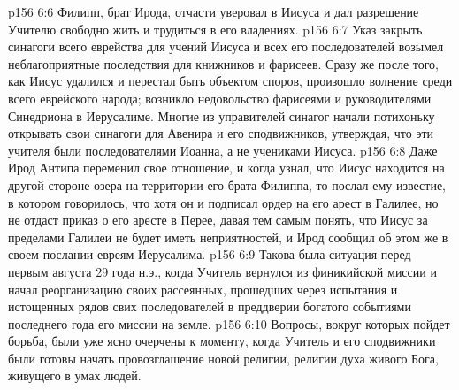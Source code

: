 \vs p156 6:6 Филипп, брат Ирода, отчасти уверовал в Иисуса и дал разрешение Учителю свободно жить и трудиться в его владениях.
\vs p156 6:7 Указ закрыть синагоги всего еврейства для учений Иисуса и всех его последователей возымел неблагоприятные последствия для книжников и фарисеев. Сразу же после того, как Иисус удалился и перестал быть объектом споров, произошло волнение среди всего еврейского народа; возникло недовольство фарисеями и руководителями Синедриона в Иерусалиме. Многие из управителей синагог начали потихоньку открывать свои синагоги для Авенира и его сподвижников, утверждая, что эти учителя были последователями Иоанна, а не учениками Иисуса.
\vs p156 6:8 Даже Ирод Антипа переменил свое отношение, и когда узнал, что Иисус находится на другой стороне озера на территории его брата Филиппа, то послал ему известие, в котором говорилось, что хотя он и подписал ордер на его арест в Галилее, но не отдаст приказ о его аресте в Перее, давая тем самым понять, что Иисус за пределами Галилеи не будет иметь неприятностей, и Ирод сообщил об этом же в своем послании евреям Иерусалима.
\vs p156 6:9 Такова была ситуация перед первым августа 29 года н.э., когда Учитель вернулся из финикийской миссии и начал реорганизацию своих рассеянных, прошедших через испытания и истощенных рядов свих последователей в преддверии богатого событиями последнего года его миссии на земле.
\vs p156 6:10 Вопросы, вокруг которых пойдет борьба, были уже ясно очерчены к моменту, когда Учитель и его сподвижники были готовы начать провозглашение новой религии, религии духа живого Бога, живущего в умах людей.
